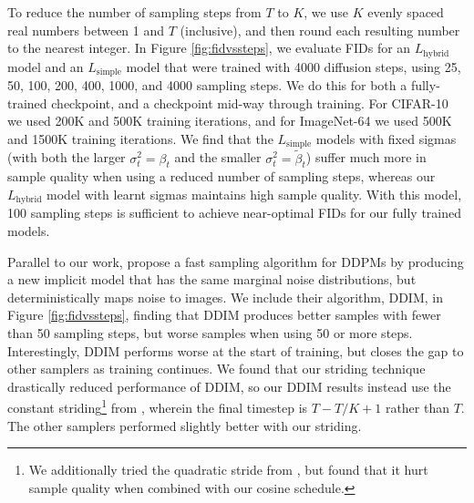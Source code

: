 \documentclass{article}
\begin{document}
To reduce the number of sampling steps from $T$ to $K$, we use $K$ evenly spaced real numbers between 1 and $T$ (inclusive), and then round each resulting number to the nearest integer. In Figure \ref{fig:fidvssteps}, we evaluate FIDs for an $L_{\text{hybrid}}$ model and an $L_{\text{simple}}$ model that were trained with 4000 diffusion steps, using 25, 50, 100, 200, 400, 1000, and 4000 sampling steps. We do this for both a fully-trained checkpoint, and a checkpoint mid-way through training. For CIFAR-10 we used 200K and 500K training iterations, and for ImageNet-64 we used 500K and 1500K training iterations.
We find that the $L_{\text{simple}}$ models with fixed sigmas (with both the larger $\sigma_t^2 = \beta_t$ and the smaller $\sigma_t^2 = \tilde{\beta}_t$) suffer much more in sample quality when using a reduced number of sampling steps, whereas our $L_{\text{hybrid}}$ model with learnt sigmas maintains high sample quality. With this model, 100 sampling steps is sufficient to achieve near-optimal FIDs for our fully trained models. 

Parallel to our work, \citet{ddim} propose a fast sampling algorithm for DDPMs by producing a new implicit model that has the same marginal noise distributions, but deterministically maps noise to images. We include their algorithm, DDIM, in Figure \ref{fig:fidvssteps}, finding that DDIM produces better samples with fewer than 50 sampling steps, but worse samples when using 50 or more steps. Interestingly, DDIM performs worse at the start of training, but closes the gap to other samplers as training continues. We found that our striding technique drastically reduced performance of DDIM, so our DDIM results instead use the constant striding\footnote{We additionally tried the quadratic stride from \citet{ddim}, but found that it hurt sample quality when combined with our cosine schedule.} from \citet{ddim}, wherein the final timestep is $T-T/K+1$ rather than $T$. The other samplers performed slightly better with our striding.

\end{document}
